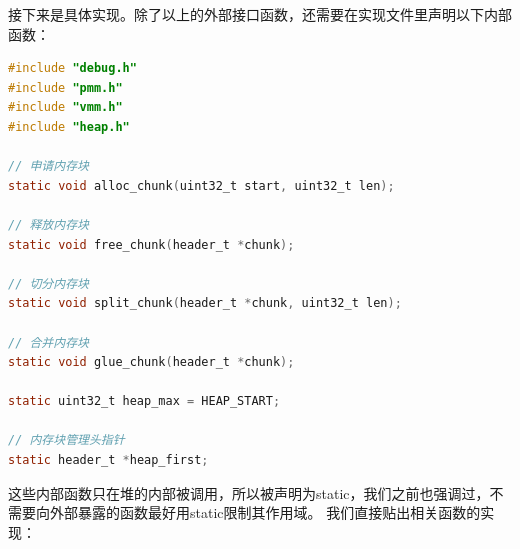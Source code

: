 \par 接下来是具体实现。除了以上的外部接口函数，还需要在实现文件里声明以下内部函数：

\begin{lstlisting}[language = C, caption = mm/heap.c]
#include "debug.h"
#include "pmm.h"
#include "vmm.h"
#include "heap.h"

// 申请内存块
static void alloc_chunk(uint32_t start, uint32_t len);

// 释放内存块
static void free_chunk(header_t *chunk);

// 切分内存块
static void split_chunk(header_t *chunk, uint32_t len);

// 合并内存块
static void glue_chunk(header_t *chunk);

static uint32_t heap_max = HEAP_START;

// 内存块管理头指针
static header_t *heap_first;
\end{lstlisting}

\par 这些内部函数只在堆的内部被调用，所以被声明为static，我们之前也强调过，不需要向外部暴露的函数最好用static限制其作用域。\allowbreak
我们直接贴出相关函数的实现：

